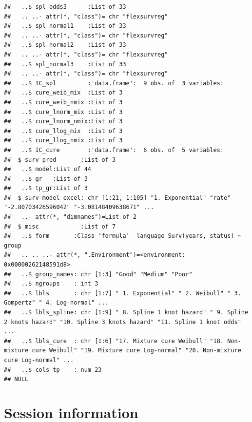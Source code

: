 \documentclass[
]{article}
\begin{document}
\begin{verbatim}
##   ..$ spl_odds3      :List of 33
##   .. ..- attr(*, "class")= chr "flexsurvreg"
##   ..$ spl_normal1    :List of 33
##   .. ..- attr(*, "class")= chr "flexsurvreg"
##   ..$ spl_normal2    :List of 33
##   .. ..- attr(*, "class")= chr "flexsurvreg"
##   ..$ spl_normal3    :List of 33
##   .. ..- attr(*, "class")= chr "flexsurvreg"
##   ..$ IC_spl         :'data.frame':  9 obs. of  3 variables:
##   ..$ cure_weib_mix  :List of 3
##   ..$ cure_weib_nmix :List of 3
##   ..$ cure_lnorm_mix :List of 3
##   ..$ cure_lnorm_nmix:List of 3
##   ..$ cure_llog_mix  :List of 3
##   ..$ cure_llog_nmix :List of 3
##   ..$ IC_cure        :'data.frame':  6 obs. of  5 variables:
##  $ surv_pred       :List of 3
##   ..$ model:List of 44
##   ..$ gr   :List of 3
##   ..$ tp_gr:List of 3
##  $ surv_model_excel: chr [1:21, 1:105] "1. Exponential" "rate" "-2.80703426596042" "-3.08148409638671" ...
##   ..- attr(*, "dimnames")=List of 2
##  $ misc            :List of 7
##   ..$ form       :Class 'formula'  language Surv(years, status) ~ group
##   .. .. ..- attr(*, ".Environment")=<environment: 0x00000262148591d8> 
##   ..$ group_names: chr [1:3] "Good" "Medium" "Poor"
##   ..$ ngroups    : int 3
##   ..$ lbls       : chr [1:7] " 1. Exponential" " 2. Weibull" " 3. Gompertz" " 4. Log-normal" ...
##   ..$ lbls_spline: chr [1:9] " 8. Spline 1 knot hazard" " 9. Spline 2 knots hazard" "10. Spline 3 knots hazard" "11. Spline 1 knot odds" ...
##   ..$ lbls_cure  : chr [1:6] "17. Mixture cure Weibull" "18. Non-mixture cure Weibull" "19. Mixture cure Log-normal" "20. Non-mixture cure Log-normal" ...
##   ..$ cols_tp    : num 23
## NULL
\end{verbatim}

\clearpage

\hypertarget{session-information}{%
\section{Session information}\label{session-information}}
\end{document}
